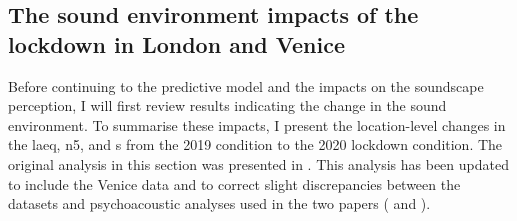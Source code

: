 \subsection{The sound environment impacts of the lockdown in London and Venice}
\label{sec:LondonLockdown}
Before continuing to the predictive model and the impacts on the soundscape perception, I will first review results indicating the change in the sound environment. To summarise these impacts, I present the location-level changes in the \gls{laeq}, \gls{n5}, and \gls{s} from the 2019 condition to the 2020 lockdown condition. The original analysis in this section was presented in \citet{Aletta2020Assessing}. This analysis has been updated to include the Venice data and to correct slight discrepancies between the datasets and psychoacoustic analyses used in the two papers (\citep{Aletta2020Assessing} and \citep{Mitchell2021Investigating}).


